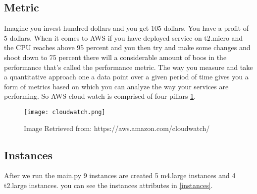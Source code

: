 \documentclass[12pt]{article}
\begin{document}
        \subsection{Metric}
        Imagine you invest hundred dollars and you get 105 dollars. You have a profit of 5 dollars.
        When it comes to AWS if you have deployed service on t2.micro and the CPU reaches above 95 percent and you then try and make some changes and shoot down to 75 percent there will a considerable amount of boos in the performance that's called the performance metric. The way you measure and take a quantitative approach one a data point over a given period of time gives you a form of metrics based on which you can analyze the way your services are performing. So AWS cloud watch is comprised of four pillars \ref{fig:cw}.

        \begin{figure}[htpb]
        \centering
        \texttt{[image: cloudwatch.png]}
            \caption\small{Image Retrieved from: https://aws.amazon.com/cloudwatch/}
            \label{fig:cw}
        \end{figure}

        \subsection{Instances}
        After we run the main.py 9 instances are created 5 m4.large instances and 4 t2.large instances. you can see the instances attributes in \ref{instances}. 

        \begin{table}[]
            \centering
        
            \label{instances}
        \end{table}
\end{document}
